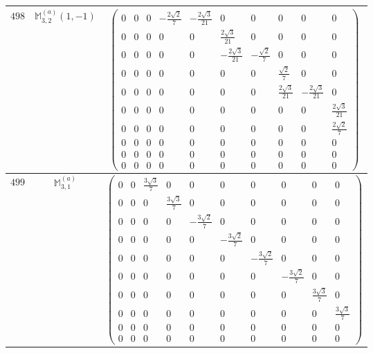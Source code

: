\documentclass[fleqn,8pt,landscape]{jsarticle}
\begin{document}
\begin{center}
\begin{longtable}{ccc}
$ 498 $ & $ \mathbb{M}_{3,2}^{(a)}(1,-1) $ & $ \begin{pmatrix} 0 & 0 & 0 & - \frac{2 \sqrt{2}}{7} & - \frac{2 \sqrt{3}}{21} & 0 & 0 & 0 & 0 & 0 \\ 0 & 0 & 0 & 0 & 0 & \frac{2 \sqrt{3}}{21} & 0 & 0 & 0 & 0 \\ 0 & 0 & 0 & 0 & 0 & - \frac{2 \sqrt{3}}{21} & - \frac{\sqrt{2}}{7} & 0 & 0 & 0 \\ 0 & 0 & 0 & 0 & 0 & 0 & 0 & \frac{\sqrt{2}}{7} & 0 & 0 \\ 0 & 0 & 0 & 0 & 0 & 0 & 0 & \frac{2 \sqrt{3}}{21} & - \frac{2 \sqrt{3}}{21} & 0 \\ 0 & 0 & 0 & 0 & 0 & 0 & 0 & 0 & 0 & \frac{2 \sqrt{3}}{21} \\ 0 & 0 & 0 & 0 & 0 & 0 & 0 & 0 & 0 & \frac{2 \sqrt{2}}{7} \\ 0 & 0 & 0 & 0 & 0 & 0 & 0 & 0 & 0 & 0 \\ 0 & 0 & 0 & 0 & 0 & 0 & 0 & 0 & 0 & 0 \\ 0 & 0 & 0 & 0 & 0 & 0 & 0 & 0 & 0 & 0 \end{pmatrix} $ \\ \hline
$ 499 $ & $ \mathbb{M}_{3,1}^{(a)} $ & $ \begin{pmatrix} 0 & 0 & \frac{3 \sqrt{3}}{7} & 0 & 0 & 0 & 0 & 0 & 0 & 0 \\ 0 & 0 & 0 & \frac{3 \sqrt{3}}{7} & 0 & 0 & 0 & 0 & 0 & 0 \\ 0 & 0 & 0 & 0 & - \frac{3 \sqrt{2}}{7} & 0 & 0 & 0 & 0 & 0 \\ 0 & 0 & 0 & 0 & 0 & - \frac{3 \sqrt{2}}{7} & 0 & 0 & 0 & 0 \\ 0 & 0 & 0 & 0 & 0 & 0 & - \frac{3 \sqrt{2}}{7} & 0 & 0 & 0 \\ 0 & 0 & 0 & 0 & 0 & 0 & 0 & - \frac{3 \sqrt{2}}{7} & 0 & 0 \\ 0 & 0 & 0 & 0 & 0 & 0 & 0 & 0 & \frac{3 \sqrt{3}}{7} & 0 \\ 0 & 0 & 0 & 0 & 0 & 0 & 0 & 0 & 0 & \frac{3 \sqrt{3}}{7} \\ 0 & 0 & 0 & 0 & 0 & 0 & 0 & 0 & 0 & 0 \\ 0 & 0 & 0 & 0 & 0 & 0 & 0 & 0 & 0 & 0 \end{pmatrix} $ \\ \hline

\end{longtable}
\end{center}
\end{document}
